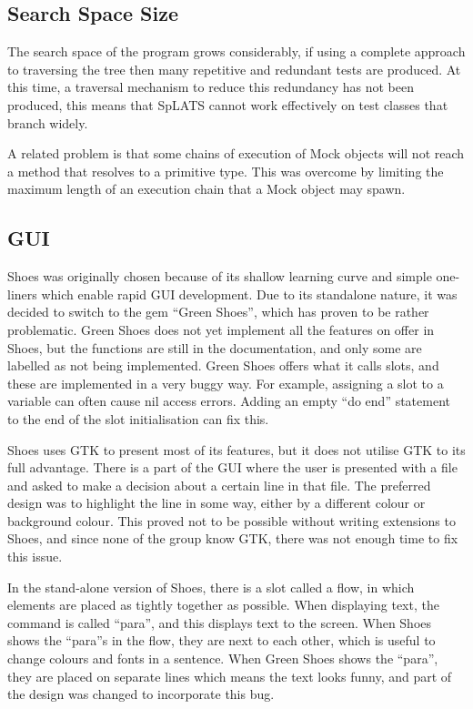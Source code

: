   \subsection{Search Space Size}
    The search space of the program grows considerably, if using a complete
approach to traversing the tree then many repetitive and redundant tests are
produced. At this time, a traversal mechanism to reduce this redundancy has not
been produced, this means that SpLATS cannot work effectively on test classes
that branch widely.

    A related problem is that some chains of execution of Mock objects will not
reach a method that resolves to a primitive type. This was overcome by limiting
the maximum length of an execution chain that a Mock object may spawn.

  \subsection{GUI}
    Shoes was originally chosen because of its shallow learning curve and simple one-liners which enable rapid GUI development. Due to its standalone nature, it was decided to switch to the gem ``Green Shoes'', which has proven to be rather problematic. Green Shoes does not yet implement all the features on offer in Shoes, but the functions are still in the documentation, and only some are labelled as not being implemented. Green Shoes offers what it calls slots, and these are implemented in a very buggy way. For example, assigning a slot to a variable can often cause nil access errors. Adding an empty ``do end'' statement to the end of the slot initialisation can fix this. 
    
    Shoes uses GTK to present most of its features, but it does not utilise GTK to its full advantage. There is a part of the GUI where the user is presented with a file and asked to make a decision about a certain line in that file. The preferred design was to highlight the line in some way, either by a different colour or background colour. This proved not to be possible without writing extensions to Shoes, and since none of the group know GTK, there was not enough time to fix this issue.
    
    In the stand-alone version of Shoes, there is a slot called a flow, in which elements are placed as tightly together as possible. When displaying text, the command is called ``para'', and this displays text to the screen. When Shoes shows the ``para''s in the flow, they are next to each other, which is useful to change colours and fonts in a sentence. When Green Shoes shows the ``para'', they are placed on separate lines which means the text looks funny, and part of the design was changed to incorporate this bug.
